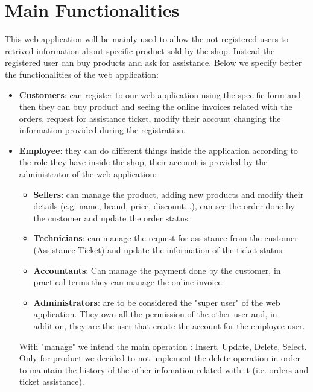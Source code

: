 \section{Main Functionalities}

This web application will be mainly used to allow the not registered users to retrived information about specific product sold by the shop. Instead the registered user can buy products and ask for assistance. Below we specify better the functionalities of the web application:
\begin{itemize}
    \item \textbf{Customers}: can register to our web application using the specific form and then they can buy product and seeing the online invoices related with the orders, request for assistance ticket, modify their account changing the information provided during the registration.
    \item \textbf{Employee}: they can do different things inside the application according to the role they have inside the shop, their account is provided by the administrator of the web application:
    \begin{itemize}
        \item \textbf{Sellers}: can manage the product, adding new products and modify their details (e.g. name, brand, price, discount...), can see the order done by the customer and update the order status.
        \item \textbf{Technicians}: can manage the request for assistance from the customer (Assistance Ticket) and update the information of the ticket status.
        \item \textbf{Accountants}: Can manage the payment done by the customer, in practical terms they can manage the online invoice.
        \item \textbf{Administrators}: are to be considered the "super user" of the web application. They own all the permission of the other user and, in addition, they are the user that create the account for the employee user.
    \end{itemize}
    With "manage" we intend the main operation : Insert, Update, Delete, Select. Only for product we decided to not implement the delete operation in order to maintain the history of the other infomation related with it (i.e. orders and ticket assistance).
\end{itemize}